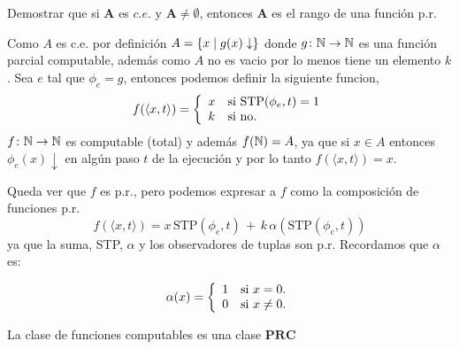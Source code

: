\documentclass[leqno, 12pt, twoside,letterpaper]{book}
\begin{document}
\begin{ej}{2}
    Demostrar que si $\bm{A}$ es $c.e.$ y $\bm{A} \neq \emptyset$, entonces
    $\bm{A}$ es el rango de una función p.r.
\end{ej}

\begin{solucion}
	Como $A$ es c.e. por definición $A = \{ x \mid  g(x) \downarrow \}$ donde $g \colon \mathbb{N} \to \mathbb{N}$ es una función parcial computable, además como $A$ no es vacio por lo menos tiene un elemento $k$. Sea $e$ tal que $\phi_{e} = g$, entonces podemos definir la siguiente funcion,
	\[ f(\langle x, t \rangle) = \left\{ \begin{array}{ll} x & \mbox{si } \mbox{STP}(\phi_e, t) = 1 \\ k & \mbox{} \mbox{si no.} \end{array} \right. \]
\noindent $f \colon \mathbb{N} \to \mathbb{N}$ es computable (total) y además $f(\mathbb{N}) = A$, ya que si $x \in A$ entonces $\phi_e(x) \downarrow$ en algún paso $t$ de la ejecución y por lo tanto $f(\langle x, t \rangle) = x$.

\noindent Queda ver que $f$ es p.r., pero podemos expresar a $f$ como la composición de funciones p.r.
\[ f(\langle x, t \rangle) = x \, \mbox{STP}(\phi_e, t) \, + \, k \, \alpha(\mbox{STP}(\phi_e, t)) \]
\noindent ya que la suma, STP, $\alpha$ y los observadores de tuplas son p.r. Recordamos que $\alpha$ es:

	\[ \alpha(x) = \left\{ \begin{array}{ll} 1 & \mbox{si } x = 0. \\ 0 & \mbox{} \mbox{si } x \neq 0. \end{array} \right.\]

\end{solucion}

\begin{ej}{1}
    La clase de funciones computables es una clase $\bm{PRC}$
\end{ej}
\end{document}
